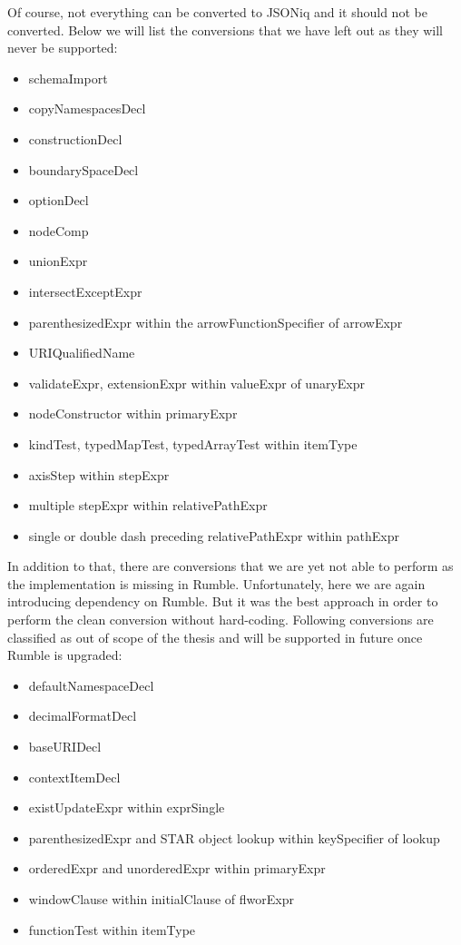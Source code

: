 Of course, not everything can be converted to JSONiq and it should not be converted. Below we will list the conversions that we have left out as they will never be supported:
\begin{itemize}
	\item schemaImport
	\item copyNamespacesDecl
	\item constructionDecl
	\item boundarySpaceDecl
	\item optionDecl
	\item nodeComp
	\item unionExpr
	\item intersectExceptExpr
	\item parenthesizedExpr within the arrowFunctionSpecifier of arrowExpr
	\item URIQualifiedName
	\item validateExpr, extensionExpr within valueExpr of unaryExpr
	\item nodeConstructor within primaryExpr
	\item kindTest, typedMapTest, typedArrayTest within itemType
	\item axisStep within stepExpr
	\item multiple stepExpr within relativePathExpr
	\item single or double dash preceding relativePathExpr within pathExpr
\end{itemize}

In addition to that, there are conversions that we are yet not able to perform as the implementation is missing in Rumble. Unfortunately, here we are again introducing dependency on Rumble. But it was the best approach in order to perform the clean conversion without hard-coding. Following conversions are classified as out of scope of the thesis and will be supported in future once Rumble is upgraded:
\begin{itemize}
	\item defaultNamespaceDecl
	\item decimalFormatDecl
	\item baseURIDecl
	\item contextItemDecl
	\item existUpdateExpr within exprSingle
	\item parenthesizedExpr and STAR object lookup within keySpecifier of lookup
	\item orderedExpr and unorderedExpr within primaryExpr
	\item windowClause within initialClause of flworExpr
	\item functionTest within itemType
\end{itemize}

